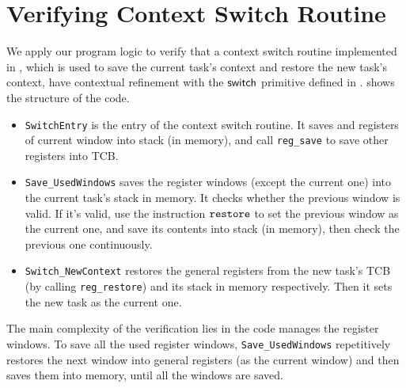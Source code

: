 \section{Verifying Context Switch Routine}
\label{sec:ctxswitch}

\indent
We apply our program logic to verify
that a context switch routine implemented in \sparc,
which is used to save the current task's context and
restore the new task's context, 
have contextual refinement with the $\mathsf{switch}{}$ primitive 
defined in \Sec{\ref{subsec:High-level Pseudo-SPARCv8 Language}}. 
\Fig{\ref{fig:The Structure of Context Switch Routine}}
shows the structure of the code.
\begin{center}
    
	\label{fig:The Structure of Context Switch Routine}
\end{center}
\begin{itemize}
    \item \texttt{SwitchEntry}
    is the entry of the context switch routine. 
    It saves \localRN{} and \inRN{} registers of current
    window into stack (in memory), and call 
    \texttt{reg\_save} to save other registers into TCB.
    
    \item
    \texttt{Save\_UsedWindows} saves
	the register windows (except the current one)
    into the current task's stack in memory. 
    It checks whether the previous window is valid. 
    If it's valid, use the instruction $\texttt{restore}{}$ 
    to set the previous window as the current one, 
    and save its contents into stack (in memory), 
    then check the previous one continuously.

    \item     
    \texttt{Switch\_NewContext}
    restores the general registers from the new task's TCB 
    (by calling \texttt{reg\_restore})
    and its stack in memory 
    respectively. Then it sets the new task as
    the current one.
\end{itemize}

The main complexity of the verification lies in
the code manages the register windows.
To save all the used 
register windows, \texttt{Save\_UsedWindows}
repetitively restores the next window into general registers
(as the current window)
and then saves them into memory, until all the windows are saved.

